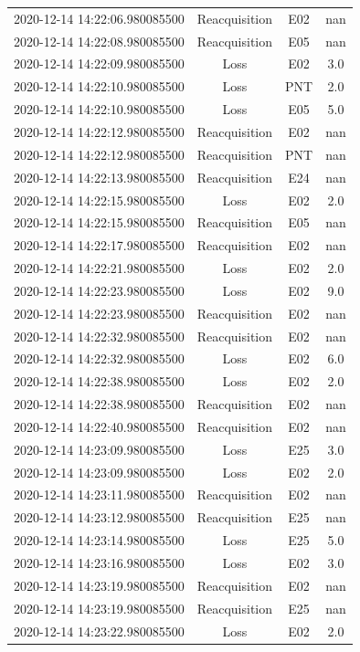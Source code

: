 \begin{enumerate}
\begin{longtabu}{cccc}
2020{-}12{-}14 14:22:06.980085500&Reacquisition&E02&nan\\%
2020{-}12{-}14 14:22:08.980085500&Reacquisition&E05&nan\\%
2020{-}12{-}14 14:22:09.980085500&Loss&E02&3.0\\%
2020{-}12{-}14 14:22:10.980085500&Loss&PNT&2.0\\%
2020{-}12{-}14 14:22:10.980085500&Loss&E05&5.0\\%
2020{-}12{-}14 14:22:12.980085500&Reacquisition&E02&nan\\%
2020{-}12{-}14 14:22:12.980085500&Reacquisition&PNT&nan\\%
2020{-}12{-}14 14:22:13.980085500&Reacquisition&E24&nan\\%
2020{-}12{-}14 14:22:15.980085500&Loss&E02&2.0\\%
2020{-}12{-}14 14:22:15.980085500&Reacquisition&E05&nan\\%
2020{-}12{-}14 14:22:17.980085500&Reacquisition&E02&nan\\%
2020{-}12{-}14 14:22:21.980085500&Loss&E02&2.0\\%
2020{-}12{-}14 14:22:23.980085500&Loss&E02&9.0\\%
2020{-}12{-}14 14:22:23.980085500&Reacquisition&E02&nan\\%
2020{-}12{-}14 14:22:32.980085500&Reacquisition&E02&nan\\%
2020{-}12{-}14 14:22:32.980085500&Loss&E02&6.0\\%
2020{-}12{-}14 14:22:38.980085500&Loss&E02&2.0\\%
2020{-}12{-}14 14:22:38.980085500&Reacquisition&E02&nan\\%
2020{-}12{-}14 14:22:40.980085500&Reacquisition&E02&nan\\%
2020{-}12{-}14 14:23:09.980085500&Loss&E25&3.0\\%
2020{-}12{-}14 14:23:09.980085500&Loss&E02&2.0\\%
2020{-}12{-}14 14:23:11.980085500&Reacquisition&E02&nan\\%
2020{-}12{-}14 14:23:12.980085500&Reacquisition&E25&nan\\%
2020{-}12{-}14 14:23:14.980085500&Loss&E25&5.0\\%
2020{-}12{-}14 14:23:16.980085500&Loss&E02&3.0\\%
2020{-}12{-}14 14:23:19.980085500&Reacquisition&E02&nan\\%
2020{-}12{-}14 14:23:19.980085500&Reacquisition&E25&nan\\%
2020{-}12{-}14 14:23:22.980085500&Loss&E02&2.0\\%

\end{longtabu}
\end{enumerate}
